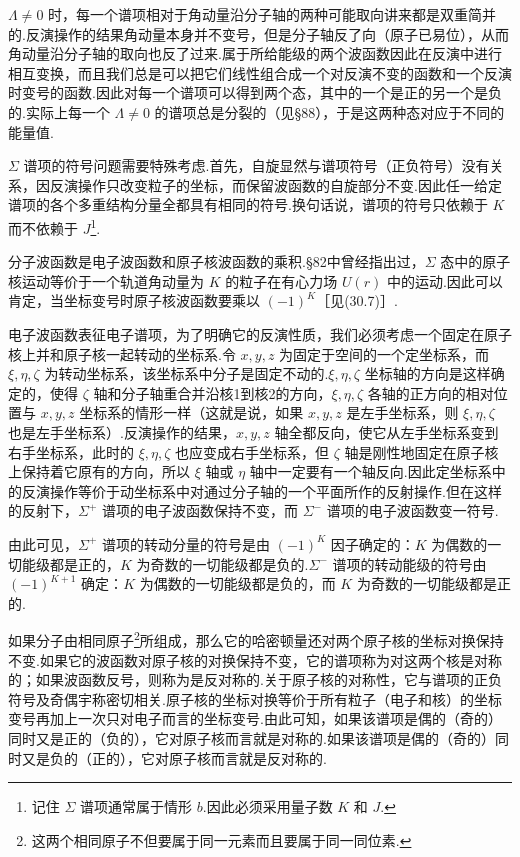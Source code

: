 $\Lambda\neq0$ 时，每一个谱项相对于角动量沿分子轴的两种可能取向讲来都是双重简并的.反演操作的结果角动量本身并不变号，但是分子轴反了向（原子已易位），从而角动量沿分子轴的取向也反了过来.属于所给能级的两个波函数因此在反演中进行相互变换，而且我们总是可以把它们线性组合成一个对反演不变的函数和一个反演时变号的函数.因此对每一个谱项可以得到两个态，其中的一个是正的另一个是负的.实际上每一个 $\Lambda\neq0$ 的谱项总是分裂的（见§88），于是这两种态对应于不同的能量值.

$\Sigma$ 谱项的符号问题需要特殊考虑.首先，自旋显然与谱项符号（正负符号）没有关系，因反演操作只改变粒子的坐标，而保留波函数的自旋部分不变.因此任一给定谱项的各个多重结构分量全都具有相同的符号.换句话说，谱项的符号只依赖于 $K$ 而不依赖于 $J$\footnote{记住 $\Sigma$ 谱项通常属于情形 $b$.因此必须采用量子数 $K$ 和 $J$.}.

分子波函数是电子波函数和原子核波函数的乘积.§82中曾经指出过，$\Sigma$ 态中的原子核运动等价于一个轨道角动量为 $K$ 的粒子在有心力场 $U(r)$ 中的运动.因此可以肯定，当坐标变号时原子核波函数要乘以 $(-1)^K$［见(30.7)］.

电子波函数表征电子谱项，为了明确它的反演性质，我们必须考虑一个固定在原子核上并和原子核一起转动的坐标系.令 $x,y,z$ 为固定于空间的一个定坐标系，而 $\xi,\eta,\zeta$ 为转动坐标系，该坐标系中分子是固定不动的.$\xi,\eta,\zeta$ 坐标轴的方向是这样确定的，使得 $\zeta$ 轴和分子轴重合并沿核1到核2的方向，$\xi,\eta,\zeta$ 各轴的正方向的相对位置与 $x,y,z$ 坐标系的情形一样（这就是说，如果 $x,y,z$ 是左手坐标系，则 $\xi,\eta,\zeta$ 也是左手坐标系）.反演操作的结果，$x,y,z$ 轴全都反向，使它从左手坐标系变到右手坐标系，此时的 $\xi,\eta,\zeta$ 也应变成右手坐标系，但 $\zeta$ 轴是刚性地固定在原子核上保持着它原有的方向，所以 $\xi$ 轴或 $\eta$ 轴中一定要有一个轴反向.因此定坐标系中的反演操作等价于动坐标系中对通过分子轴的一个平面所作的反射操作.但在这样的反射下，$\Sigma^+$ 谱项的电子波函数保持不变，而 $\Sigma^-$ 谱项的电子波函数变一符号.

由此可见，$\Sigma^+$ 谱项的转动分量的符号是由 $(-1)^K$ 因子确定的：$K$ 为偶数的一切能级都是正的，$K$ 为奇数的一切能级都是负的.$\Sigma^-$ 谱项的转动能级的符号由 $(-1)^{K+1}$ 确定：$K$ 为偶数的一切能级都是负的，而 $K$ 为奇数的一切能级都是正的.

如果分子由相同原子\footnote{这两个相同原子不但要属于同一元素而且要属于同一同位素.}所组成，那么它的哈密顿量还对两个原子核的坐标对换保持不变.如果它的波函数对原子核的对换保持不变，它的谱项称为对这两个核是对称的；如果波函数反号，则称为是反对称的.关于原子核的对称性，它与谱项的正负符号及奇偶宇称密切相关.原子核的坐标对换等价于所有粒子（电子和核）的坐标变号再加上一次只对电子而言的坐标变号.由此可知，如果该谱项是偶的（奇的）同时又是正的（负的），它对原子核而言就是对称的.如果该谱项是偶的（奇的）同时又是负的（正的），它对原子核而言就是反对称的.

